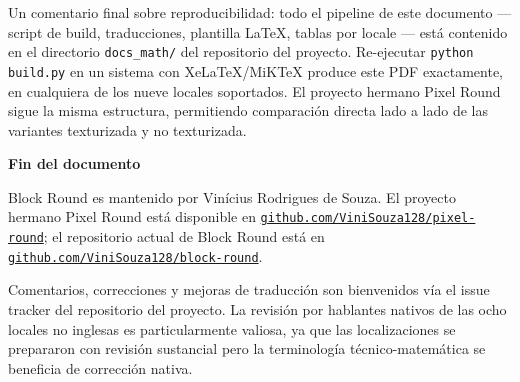 \documentclass[12pt,a4paper]{scrartcl}
\newcommand{\code}[1]{\texttt{\small #1}}
\newcommand{\biblink}[2]{\href{#1}{\nolinkurl{#2}}}
\begin{document}
Un comentario final sobre reproducibilidad: todo el pipeline de este documento --- script de build, traducciones, plantilla LaTeX, tablas por locale --- está contenido en el directorio \code{docs\_math/} del repositorio del proyecto. Re-ejecutar \code{python build.py} en un sistema con XeLaTeX/MiKTeX produce este PDF exactamente, en cualquiera de los nueve locales soportados. El proyecto hermano Pixel Round sigue la misma estructura, permitiendo comparación directa lado a lado de las variantes texturizada y no texturizada.

\vspace{1.2em}

\begin{center}
{\sffamily\bfseries\color{accent}Fin del documento}
\end{center}

\vspace{0.6em}

Block Round es mantenido por Vinícius Rodrigues de Souza. El proyecto hermano Pixel Round está disponible en \biblink{https://github.com/ViniSouza128/pixel-round}{github.com/ViniSouza128/pixel-round}; el repositorio actual de Block Round está en \biblink{https://github.com/ViniSouza128/block-round}{github.com/ViniSouza128/block-round}.

Comentarios, correcciones y mejoras de traducción son bienvenidos vía el issue tracker del repositorio del proyecto. La revisión por hablantes nativos de las ocho locales no inglesas es particularmente valiosa, ya que las localizaciones se prepararon con revisión sustancial pero la terminología técnico-matemática se beneficia de corrección nativa.
\end{document}
